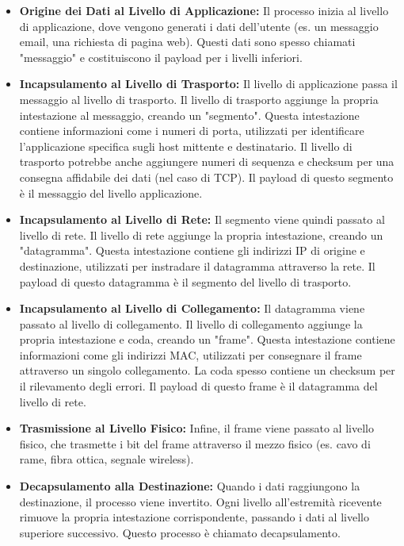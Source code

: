 \begin{itemize}
    \item \textbf{Origine dei Dati al Livello di Applicazione:} Il processo inizia al livello di applicazione, dove vengono generati i dati dell'utente (es. un messaggio email, una richiesta di pagina web). Questi dati sono spesso chiamati "messaggio" e costituiscono il payload per i livelli inferiori.
    \item \textbf{Incapsulamento al Livello di Trasporto:} Il livello di applicazione passa il messaggio al livello di trasporto. Il livello di trasporto aggiunge la propria intestazione al messaggio, creando un "segmento". Questa intestazione contiene informazioni come i numeri di porta, utilizzati per identificare l'applicazione specifica sugli host mittente e destinatario. Il livello di trasporto potrebbe anche aggiungere numeri di sequenza e checksum per una consegna affidabile dei dati (nel caso di TCP). Il payload di questo segmento è il messaggio del livello applicazione.
    \item \textbf{Incapsulamento al Livello di Rete:} Il segmento viene quindi passato al livello di rete. Il livello di rete aggiunge la propria intestazione, creando un "datagramma". Questa intestazione contiene gli indirizzi IP di origine e destinazione, utilizzati per instradare il datagramma attraverso la rete. Il payload di questo datagramma è il segmento del livello di trasporto.
    \item \textbf{Incapsulamento al Livello di Collegamento:} Il datagramma viene passato al livello di collegamento. Il livello di collegamento aggiunge la propria intestazione e coda, creando un "frame". Questa intestazione contiene informazioni come gli indirizzi MAC, utilizzati per consegnare il frame attraverso un singolo collegamento. La coda spesso contiene un checksum per il rilevamento degli errori. Il payload di questo frame è il datagramma del livello di rete.
    \item \textbf{Trasmissione al Livello Fisico:} Infine, il frame viene passato al livello fisico, che trasmette i bit del frame attraverso il mezzo fisico (es. cavo di rame, fibra ottica, segnale wireless).
    \item \textbf{Decapsulamento alla Destinazione:} Quando i dati raggiungono la destinazione, il processo viene invertito. Ogni livello all'estremità ricevente rimuove la propria intestazione corrispondente, passando i dati al livello superiore successivo. Questo processo è chiamato decapsulamento.
\end{itemize}

